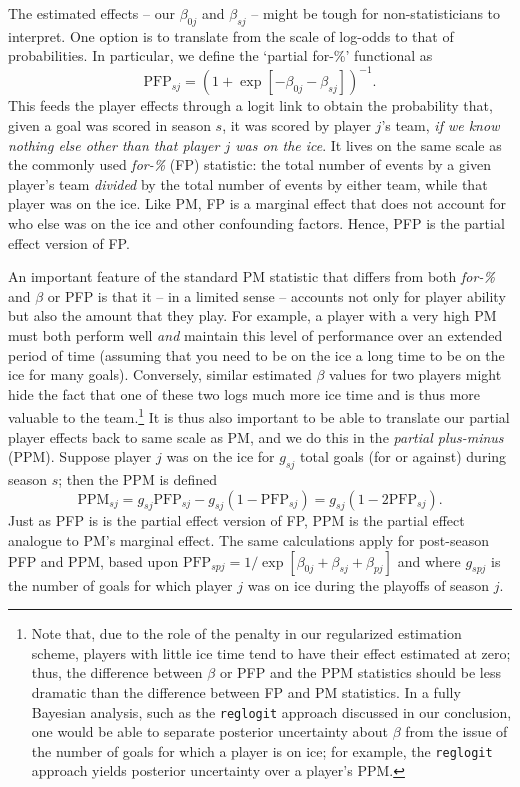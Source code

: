 The estimated effects -- our $\beta_{0j}$ and $\beta_{sj}$ -- might be tough for
non-statisticians to interpret. One option is to translate from the scale of
log-odds to that of probabilities. In particular, we define the `partial for-\%' functional as
\begin{equation}\label{eq:pfp}
\text{PFP}_{sj} = \left(1 + \exp[-\beta_{0j} - \beta_{sj}]\right)^{-1}.
\end{equation}
This feeds the player effects through a logit link  to obtain  the
probability that, given a goal was scored in season $s$, it was scored by
player $j$'s team, {\it if we know nothing else other than that player $j$ was
on the ice}. It lives on the same scale as the commonly used \textit{for-\%}
(FP) statistic: the total number of events by a given player's team
\textit{divided} by the total number of events by either team, while that
player was on the ice.   Like PM, FP is a marginal effect that does not
account for who else was on the ice and other confounding factors.  Hence, PFP
is the partial effect version of FP.

An important feature of the standard PM statistic that differs from both
\textit{for-\%} and $\beta$ or PFP is that it -- in a limited sense -- accounts
not only for player ability but also the amount that they play.  For example,
a player with a very high PM must both perform well \textit{and} maintain this
level of performance over an extended period of time (assuming that you need
to be on the ice a long time to be on the ice for many goals).  Conversely,
similar estimated $\beta$ values for two players might hide the fact that one
of these two logs much more ice time and is thus more valuable to the
team.\footnote{Note that, due to the role of the penalty in our regularized
estimation scheme,  players with little ice time tend to have their effect
estimated at zero; thus, the difference between $\beta$ or PFP and the PPM
statistics should be less dramatic than the difference between FP and PM
statistics. In a fully Bayesian analysis, such as the {\tt reglogit} approach
discussed in our conclusion, one would be able to separate posterior
uncertainty about $\beta$ from the issue of the number of goals for which a
player is on ice; for example, the {\tt reglogit} approach yields posterior
uncertainty over a player's PPM.}  It is thus also important to be able to
translate our partial player effects back to same scale as PM, and we do this
in the {\em partial plus-minus} (PPM). Suppose player $j$ was on the ice for
$g_{sj}$ total goals (for or against) during season $s$; then the PPM is
defined \begin{equation}\label{eq:ppm}  \text{PPM}_{sj} =
g_{sj}\text{PFP}_{sj} - g_{sj}(1-\text{PFP}_{sj}) = g_{sj}(1 -
2\text{PFP}_{sj}).  \end{equation}   Just as PFP is is the partial effect
version of FP, PPM is the partial effect analogue to PM's marginal effect.
The same calculations apply for  post-season PFP and PPM, based upon
$\text{PFP}_{spj} = 1/\exp[\beta_{0j} + \beta_{sj}+ \beta_{pj}]$ and where $g_{spj}$
is the number of goals for which player $j$ was on ice during the playoffs of
season $j$.

